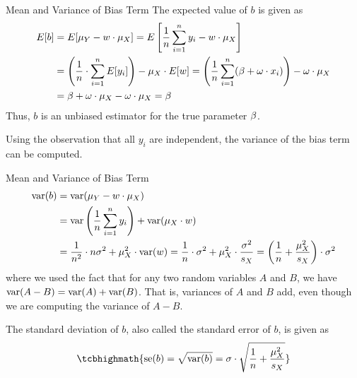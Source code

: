 \begin{frame}{Mean and Variance of Bias Term}
The expected value of $b$ is given as
\begin{align*}
    E[b] & = E[ \mu_Y - w \cdot \mu_X]
    = E\left[ \frac{1}{n} \sum^{n}_{i=1} y_i - w \cdot \mu_X \right]\\
    & = \left(\frac{1}{n} \cdot \sum_{i=1}^n E[ y_{i} ]\right) - \mu_X \cdot E[w]
    = \left(\frac{1}{n} \sum^{n}_{i=1} (\beta + \omega \cdot x_i)\right) 
    - \omega \cdot \mu_X\\
    & = \beta + \omega \cdot \mu_X - \omega \cdot \mu_X = \beta
\end{align*}
Thus, $b$ is an unbiased estimator for the true parameter $\beta$.

\medskip

Using the observation that all $y_i$ are independent, 
the variance of the bias term can be computed.
\end{frame}
%
\begin{frame}{Mean and Variance of Bias Term}
\begin{align*}
    \operatorname{var}(b) & = \operatorname{var}(\mu_Y - w \cdot \mu_X)\\
    & = \operatorname{var}\left( \frac{1}{n} \sum^{n}_{i=1} y_i \right) +
    \operatorname{var}(\mu_X \cdot w)\\
   &  = \frac{1}{n^2} \cdot n \sigma^2 + \mu_X^2 \cdot \operatorname{var}(w)
    = \frac{1}{n} \cdot \sigma^2 + \mu_X^2 \cdot \frac{\sigma^2}{s_X}
 = \left(\frac{1}{n} + \frac{\mu_X^2}{s_X}\right) \cdot \sigma^2 
\end{align*}
where we used the
fact that for any two random variables $A$ and $B$, we have $\operatorname{var}(A-B) =
\operatorname{var}(A)+\operatorname{var}(B)$. That is, variances of $A$ and $B$ add, even though we
are computing the variance of $A-B$.

\medskip

The standard deviation of $b$, also called the standard error of
$b$, is given as
\begin{align*}
    \tcbhighmath{
    \se(b) = \sqrt{\var(b)} 
= \sigma \cdot \sqrt{\frac{1}{n} + \frac{\mu_X^2}{s_X}}}
\end{align*}
\end{frame}

